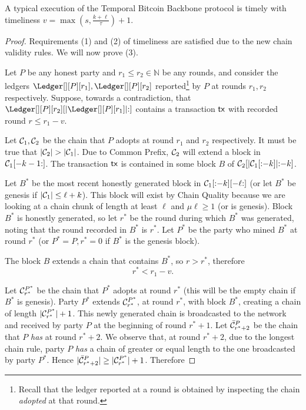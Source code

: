 \begin{theorem}
  A typical execution of the Temporal Bitcoin Backbone protocol is timely
  with timeliness $v = \max(s, \frac{k + \ell}{\tau}) + 1$.
\end{theorem}
\begin{proof}
  Requirements (1) and (2) of timeliness are satisfied due to the new chain validity rules.
  We will now prove (3).

  Let $P$ be any honest party and $r_1 \leq r_2 \in \mathbb{N}$ be any rounds, and consider
  the ledgers $\Ledger[][P][r_1], \Ledger[][P][r_2]$ reported\footnote{
    Recall that the ledger reported at a round is obtained by inspecting the
    chain \emph{adopted} at that round.
  } by $P$ at rounds $r_1, r_2$ respectively.
  Suppose, towards a contradiction, that $\Ledger[][P][r_2][|\Ledger[][P][r_1]|{:}]$ contains a transaction
  $\textsf{tx}$ with recorded round $r \leq r_1 - v$.

  Let $\mathcal{C}_1, \mathcal{C}_2$ be the chain that $P$ adopts at round $r_1$
  and $r_2$ respectively.
  It must be true that $|\mathcal{C}_2| > |\mathcal{C}_1|$.
  Due to Common Prefix, $\mathcal{C}_2$ will extend a block in $\mathcal{C}_1[-k-1{:}]$.
  The transaction $\textsf{tx}$ is contained in some block $B$ of $\mathcal{C}_2[|\mathcal{C}_1[{:}{-k}]|{:}{-k}]$.

  Let $B^*$ be the most recent
  honestly generated block in $\mathcal{C}_1[{:}{-k}][{-\ell}{:}]$
  (or let $B^*$ be genesis if $|\mathcal{C}_1| \leq \ell + k$).
  This block will exist by
  Chain Quality because we are looking at a chain chunk of length at least $\ell$ and
  $\mu\ell \geq 1$ (or is genesis).
  Block $B^*$ is honestly generated, so let $r^*$ be the round
  during which $B^*$ was generated, noting that the round recorded in $B^*$ is $r^*$.
  Let $P^*$ be the party who mined $B^*$ at round $r^*$ (or $P^* = P, r^* = 0$ if $B^*$ is
  the genesis block).

  The block $B$ extends a chain that contains $B^*$, so $r > r^*$,
  therefore
  \begin{equation}
    r^* < r_1 - v\label{eq:bitcoin-r-bound}.
  \end{equation}

  Let $\mathcal{C}^{P^*}_{r^*}$ be the chain that $P^*$ adopts at
  round $r^*$ (this will be the empty chain if $B^*$ is genesis).
  Party $P^*$ extends $\mathcal{C}^{P^*}_{r^*}$, at round $r^*$, with block $B^*$,
  creating a chain of length $|\mathcal{C}^{P^*}_{r^*}| + 1$.
  This newly generated chain is broadcasted to the network and
  received by party $P$ at the beginning of round $r^* + 1$.
  Let $\bar {\mathcal{C}}^P_{r^* + 2}$ be the chain
  that $P$ \emph{has} at round $r^* + 2$.
  We observe that, at round $r^* + 2$, due to the
  longest chain rule, party $P$ \emph{has} a chain of greater or equal
  length to the one broadcasted by party $P^*$. Hence
  $|\bar {\mathcal{C}}^P_{r^* + 2}| \geq |\mathcal{C}^{P^*}_{r^*}| + 1$. Therefore


\end{proof}
